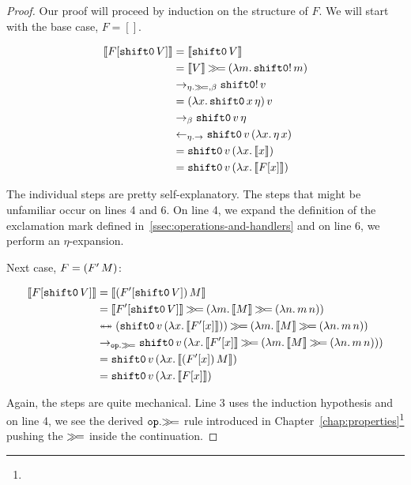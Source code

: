 \begin{proof}
Our proof will proceed by induction on the structure of $F$. We will start
with the base case, $F = []$.

\begin{align}
  \llbracket F[\mathtt{shift0}\,V] \rrbracket
  &= \llbracket \mathtt{shift0}\,V \rrbracket \\
  &= \llbracket V \rrbracket \mathbin{\gg\!=} (\lambda m.\, \mathtt{shift0}!\,m) \\
  &\to_{\eta.\mathbin{\gg\!=},\beta} \mathtt{shift0}!\,v \\
  &= (\lambda x.\, \mathtt{shift0}\,x\,\eta)\,v \\
  &\to_\beta \mathtt{shift0}\,v\,\eta \\
  &\leftarrow_{\eta.\to} \mathtt{shift0}\,v\,(\lambda x.\, \eta\,x) \\
  &= \mathtt{shift0}\,v\,(\lambda x.\, \llbracket x \rrbracket) \\
  &= \mathtt{shift0}\,v\,(\lambda x.\, \llbracket F[x] \rrbracket) \\
\end{align}
\setcounter{equation}{0}

The individual steps are pretty self-explanatory. The steps that might be
unfamiliar occur on lines 4 and 6. On line 4, we expand the definition of
the exclamation mark defined in~\ref{ssec:operations-and-handlers} and on
line 6, we perform an $\eta$-expansion.

Next case, $F = (F'\,M)$:

\begin{align}
  \sem{F[\ap{\shifto}{V}]}
  &= \sem{\ap{(F'[\ap{\shifto}{V}])}{M}} \\
  &= \sem{F'[\ap{\shifto}{V}]} \hsbind (\lam{m}{\sem{M} \hsbind (\lam{n}{\ap{m}{n}})}) \\
  &\ttoffrom (\app{\op{shift0}}{v}{(\lam{x}{\sem{F'[x]}})}) \hsbind (\lam{m}{\sem{M} \hsbind (\lam{n}{\ap{m}{n}})}) \\
  &\to_{\op{op}.\hsbind} \app{\op{shift0}}{v}{(\lam{x}{\sem{F'[x]} \hsbind (\lam{m}{\sem{M} \hsbind (\lam{n}{\ap{m}{n}})})})} \\
  &= \app{\op{shift0}}{v}{(\lam{x}{\sem{\ap{(F'[x])}{M}}})} \\
  &= \app{\op{shift0}}{v}{(\lam{x}{\sem{F[x]}})} \\
\end{align}
\setcounter{equation}{0}

Again, the steps are quite mechanical. Line 3 uses the induction hypothesis
and on line 4, we see the derived $\mathtt{op}.\mathbin{\gg\!=}$ rule introduced in
Chapter~\ref{chap:properties}\footnote{} pushing the
$\mathbin{\gg\!=}$ inside the continuation.


\end{proof}

